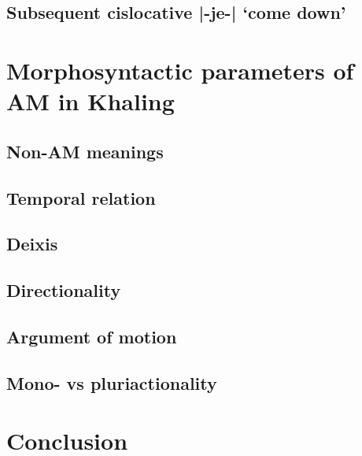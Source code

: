 \documentclass[oneside,a4paper,11pt]{article}
\newcommand{\ipa}[1]{{\phon#1}}
\newcommand{\dhatu}[2]{|\ipa{#1}| `#2'}
\begin{document}
\subsection{Subsequent cislocative \dhatu{-je-}{come down}} \label{sec:v2.je}
\section{Morphosyntactic parameters of AM in Khaling}
\subsection{Non-AM meanings}
\subsection{Temporal relation}
\subsection{Deixis}
\subsection{Directionality}
\subsection{Argument of motion}
\subsection{Mono- vs pluriactionality}

\section{Conclusion}



\end{document}
